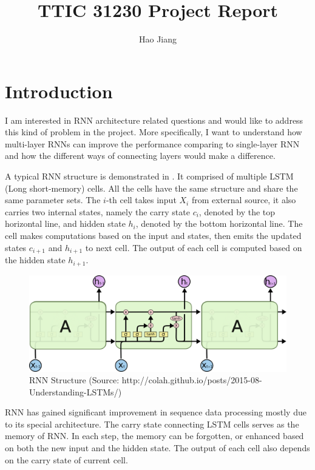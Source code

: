 \documentclass{article}
\title{TTIC 31230 Project Report}
\author{Hao Jiang}
\begin{document}
\maketitle

\section*{Introduction}
I am interested in RNN architecture related questions and would 
like to address this kind of problem in the project. More specifically,
I want to understand how multi-layer RNNs can improve the performance
comparing to single-layer RNN and how the different ways of connecting
layers would make a difference.

A typical RNN structure is demonstrated in . It comprised 
of multiple LSTM (Long short-memory) cells. All the cells have the same 
structure and share the same parameter sets. The $i$-th cell takes input 
$X_i$ from external source, it also carries two internal states, namely 
the carry state $c_i$, denoted by the top horizontal line, and hidden state
$h_i$, denoted by the bottom horizontal line. The cell makes computations 
based on the input and states, then emits the updated states $c_{i+1}$ and 
$h_{i+1}$ to next cell. The output of each cell is computed based on the 
hidden state $h_{i+1}$. 

\begin{figure}
\centering
\includegraphics[scale=0.35]{lstm.png}
\caption{RNN Structure (Source: http://colah.github.io/posts/2015-08-Understanding-LSTMs/)}
\label{fig:lstm}
\end{figure} 

RNN has gained significant improvement in sequence data processing mostly
due to its special architecture. The carry state connecting LSTM cells serves
as the memory of RNN. In each step, the memory can be forgotten, or enhanced
based on both the new input and the hidden state. The output of each cell also
depends on the carry state of current cell.
\end{document}
